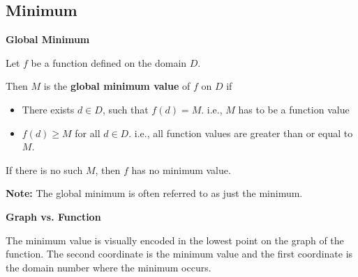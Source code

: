 \documentclass{ximera}
\begin{document}
\subsection*{Minimum}



\begin{definition} \textbf{\textcolor{green!50!black}{Global Minimum}} 


Let $f$ be a function defined on the domain $D$.

Then $M$ is the \textbf{global minimum value} of $f$ on $D$ if    


\begin{itemize}
\item There exists $d \in D$, such that $f(d) = M$.   i.e., $M$ has to be a function value 
\item $f(d) \geq M$ for all $d \in D$. i.e., all function values are greater than or equal to $M$. 

\end{itemize}


If there is no such $M$, then $f$ has no minimum value.



\textbf{Note:} The global minimum is often referred to as just the minimum.

\end{definition}



\begin{observation} \textbf{\textcolor{-red!75}{Graph vs. Function}}

The minimum value is visually encoded in the lowest point on the graph of the function.  The second coordinate is the minimum value and the first coordinate is the domain number where the minimum occurs.
\end{observation}
\end{document}

